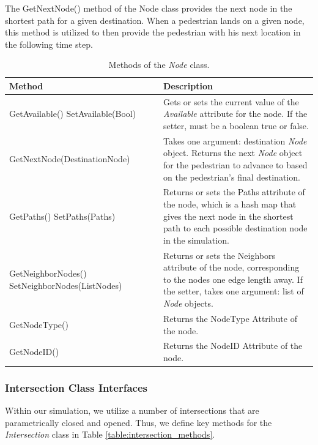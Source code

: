 \documentclass[12pt]{article}
\begin{document}
The GetNextNode() method of the Node class provides the next node in the
shortest path for a given destination. When a pedestrian lands on a given node,
this method is utilized to then provide the pedestrian with his next location
in the following time step.

\def\arraystretch{1.5}
\begin{table}
  \centering
    \begin{tabular}{p{0.5\linewidth}p{0.5\linewidth}}
     \hline
     Method & Description \\
     \hline
     GetAvailable() \newline SetAvailable(Bool)  & Gets or sets the current
                        value of the \textit{Available} attribute for the node.
                        If the setter, must be a boolean true or false. \\
     GetNextNode(DestinationNode) & Takes one argument: destination
                                    \textit{Node} object. Returns the next
                                    \textit{Node} object for the pedestrian to
                                    advance to based on the pedestrian’s final
                                    destination. \\
     GetPaths() \newline SetPaths(Paths) & Returns or sets the Paths attribute
                of the node, which is a hash map that gives the next node in
                the shortest path to each possible destination node in the
                simulation. \\
     GetNeighborNodes() \newline SetNeighborNodes(ListNodes) & Returns or sets
                        the Neighbors attribute of the node, corresponding to
                        the nodes one edge length away. If the setter, takes
                        one argument: list of \textit{Node} objects. \\
     GetNodeType() & Returns the NodeType Attribute of the node. \\
     GetNodeID() & Returns the NodeID Attribute of the node. \\
     \hline
    \end{tabular}
    \caption{Methods of the \textit{Node} class.}
  \label{table:node_methods}
\end{table}

\subsubsection{Intersection Class Interfaces}
Within our simulation, we utilize a number of intersections that are
parametrically closed and opened. Thus, we define key methods for the
\textit{Intersection} class in Table \ref{table:intersection_methods}.
\end{document}
